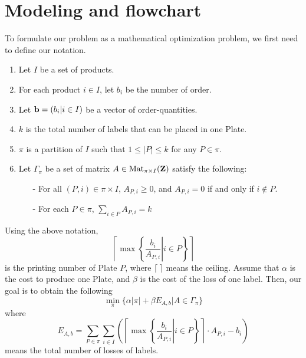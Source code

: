 \documentclass[a4paper]{amsart}
\numberwithin{equation}{section} %
\numberwithin{figure}{section} %
\numberwithin{table}{section}
\theoremstyle{plain}
\theoremstyle{definition}
\theoremstyle{plain}
\theoremstyle{plain}
\theoremstyle{plain}
\theoremstyle{plain}
\theoremstyle{plain}
\begin{document}
\section{Modeling and flowchart}\label{sec:Modeling}
To formulate our problem as a mathematical optimization problem, we first need to define our notation.
\begin{enumerate}[$\bullet$]
	\item Let $I$ be a set of products.
	\item For each product $i \in I$, let $b_{i}$ be the number of order.
	\item Let ${\bf b}=(b_{i}|i \in I)$ be a vector of order-quantities.
	\item $k$ is the total number of labels that can be placed in one Plate.
	\item $\pi$ is a partition of $I$ such that $1 \leq  |P| \leq k$ for any $P \in \pi$. 
	\item Let $\Gamma_{\pi}$ be a set of matrix $A \in {\rm Mat}_{\pi \times I}(\mathbf{Z})$ satisfy the following:
	\begin{itemize}
		\item[-] For all $(P,i) \in \pi \times I$, $A_{P,i} \geq 0$, and $A_{P,i} = 0$ if and only if $i \notin P$.
		\item[-] For each $P \in \pi$, $\sum_{i \in P}A_{P, i} = k$
\end{itemize}
\end{enumerate}

Using the above notation,
\begin{equation}\label{eq:NumPlate}
	\left\lceil \max \left\{ \left.\frac{b_{i}}{A_{P,i}}\right|i \in P \right\} \right\rceil
\end{equation}
is the printing number of Plate $P$, where $\lceil~\rceil$ means the ceiling. 
Assume that $\alpha$ is the cost to produce one Plate, and $\beta$ is the cost of the loss of one label. 
Then, our goal is to obtain the following 
\begin{equation}\label{eq:TotalCost}
	\min_{\pi} \{ \alpha|\pi| + \beta E_{A,b} | A \in \Gamma_{\pi} \}
\end{equation}
where
\begin{equation}\label{eq:TotalLoss}
	E_{A,b} = \sum_{P \in \pi} \sum_{i \in I} \left( \left\lceil \max \left\{ \left.\frac{b_{i}}{A_{P,i}}\right|i \in P \right\} \right\rceil \cdot A_{P,i} - b_{i} \right)
\end{equation}
means the total number of losses of labels.
\end{document}
